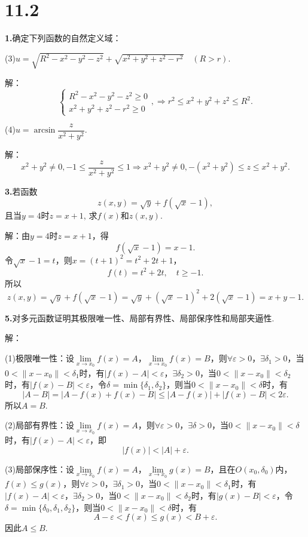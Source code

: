 \documentclass[12pt, a4paper]{article}
\begin{document}
\section*{11.2}
\textbf{1.}确定下列函数的自然定义域：

(3)\(u = \sqrt{R^2 - x^2 - y^2 - z^2} + \sqrt{x^2 + y^2 + z^2 - r^2} \quad (R > r)\).

解：
\[
\begin{cases}
R^2 - x^2 - y^2 - z^2 \geq 0 \\
x^2 + y^2 + z^2 - r^2 \geq 0
\end{cases}, \Rightarrow r^2 \leq x^2 + y^2 + z^2 \leq R^2.
\]

(4)\(u = \arcsin \dfrac{z}{x^2 + y^2}\).

解：
\[x^2 + y^2 \neq 0, -1 \leq \dfrac{z}{x^2 + y^2} \leq 1 \Rightarrow x^2 + y^2 \neq 0, - (x^2 + y^2) \leq z \leq x^2 + y^2.\]

\textbf{3.}若函数
\[z(x, y) = \sqrt{y} + f(\sqrt{x} - 1),\]
且当\(y = 4\)时\(z = x + 1\), 求\(f(x)\)和\(z(x, y)\).

解：由\(y = 4\)时\(z = x + 1\)，得
\[f(\sqrt{x} - 1) = x - 1.\]
令\(\sqrt{x} - 1 = t\)，则\(x = (t + 1)^2 = t^2 + 2t + 1\)，
\[f(t) = t^2 + 2t, \quad t \geq -1.\]
所以
\[z(x, y) = \sqrt{y} + f(\sqrt{x} - 1) = \sqrt{y} + (\sqrt{x} - 1)^2 + 2(\sqrt{x} - 1) = x + y - 1.\]

\textbf{5.}对多元函数证明其极限唯一性、局部有界性、局部保序性和局部夹逼性.

解：

(1)极限唯一性：设\(\lim\limits_{x \to x_0} f(x) = A\)，\(\lim\limits_{x \to x_0} f(x) = B\)，则\(\forall \varepsilon > 0\)，\(\exists \delta_1 > 0\)，当\(0 < \|x - x_0\| < \delta_1\)时，有\(|f(x) - A| < \varepsilon\)，\(\exists \delta_2 > 0\)，当\(0 < \|x - x_0\| < \delta_2\)时，有\(|f(x) - B| < \varepsilon\)，令\(\delta = \min\{\delta_1, \delta_2\}\)，则当\(0 < \|x - x_0\| < \delta\)时，有
\[|A - B| = |A - f(x) + f(x) - B| \leq |A - f(x)| + |f(x) - B| < 2\varepsilon.\]
所以\(A = B\). 

(2)局部有界性：设\(\lim\limits_{x \to x_0} f(x) = A\)，则\(\forall \varepsilon > 0\)，\(\exists \delta > 0\)，当\(0 < \|x - x_0\| < \delta\)时，有\(|f(x) - A| < \varepsilon\)，即
\[|f(x)| < |A| + \varepsilon.\]

(3)局部保序性：设\(\lim\limits_{x \to x_0} f(x) = A\)，\(\lim\limits_{x \to x_0} g(x) = B\)，且在\(O(x_0, \delta_0)\)内，\(f(x) \leq g(x)\)，则\(\forall \varepsilon > 0\)，\(\exists \delta_1 > 0\)，当\(0 < \|x - x_0\| < \delta_1\)时，有\(|f(x) - A| < \varepsilon\)，\(\exists \delta_2 > 0\)，当\(0 < \|x - x_0\| < \delta_2\)时，有\(|g(x) - B| < \varepsilon\)，令\(\delta = \min\{\delta_0, \delta_1, \delta_2\}\)，则当\(0 < \|x - x_0\| < \delta\)时，有
\[A - \varepsilon < f(x) \leq g(x) < B + \varepsilon.\]
因此\(A \leq B\).
\end{document}
